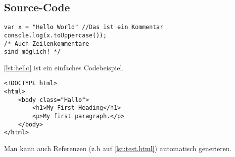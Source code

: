 \subsection{Source-Code}\label{subsec:code}
	
\begin{lstlisting}[style=htmlcssjs,float=h,caption={JavaScript Hello World Beispiel},label=lst:hello]
var x = "Hello World" //Das ist ein Kommentar
console.log(x.toUppercase());
/* Auch Zeilenkommentare
sind möglich! */
\end{lstlisting}
	
\autoref{lst:hello} ist ein einfaches Codebeispiel.

\begin{lstlisting}[style=htmlcssjs,float=h,caption={Einfaches HTML Beispiel},label=lst:html]
<!DOCTYPE html>
<html>
	<body class="Hallo">
		<h1>My First Heading</h1>
		<p>My first paragraph.</p>
	</body>
</html>
\end{lstlisting}


Man kann auch Referenzen (z.b auf \autoref{lst:test.html}) automatisch generieren.